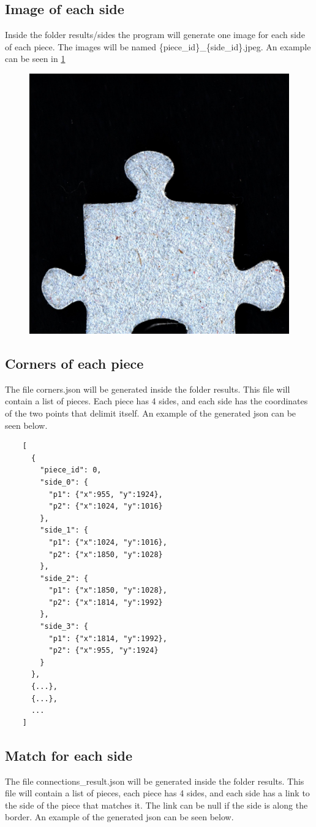 \documentclass{article}
\begin{document}
\subsection{Image of each side}

Inside the folder results/sides the program will generate one image 
for each side of each piece. The images will be named \{piece\_id\}\_\{side\_id\}.jpeg.
An example can be seen in \ref{fig:result_sides}

\begin{figure}[H]
  \caption{}\label{fig:result_sides}
  \centering
  \includegraphics[height=0.3\textwidth]{pictures/result_sides.jpeg}
\end{figure}

\subsection{Corners of each piece}
The file corners.json will be generated inside the folder results.
This file will contain a list of pieces.
Each piece has 4 sides, and each side has the coordinates of the two points
that delimit itself.\newline
An example of the generated json can be seen below.


\begin{minipage}{\textwidth}
  \begin{lstlisting}
    [
      {
        "piece_id": 0,
        "side_0": {
          "p1": {"x":955, "y":1924},
          "p2": {"x":1024, "y":1016}
        },
        "side_1": {
          "p1": {"x":1024, "y":1016},
          "p2": {"x":1850, "y":1028}
        },
        "side_2": {
          "p1": {"x":1850, "y":1028},
          "p2": {"x":1814, "y":1992}
        },
        "side_3": {
          "p1": {"x":1814, "y":1992},
          "p2": {"x":955, "y":1924}
        }
      },
      {...},
      {...},
      ...
    ]
  \end{lstlisting}
\end{minipage}

\subsection{Match for each side}
The file connections\_result.json will be generated
inside the folder results. This file will contain a list of pieces,
each piece has 4 sides, and each side has a link to the side of the piece
that matches it. The link can be null if the side is along the border.\newline
An example of the generated json can be seen below.
\end{document}
